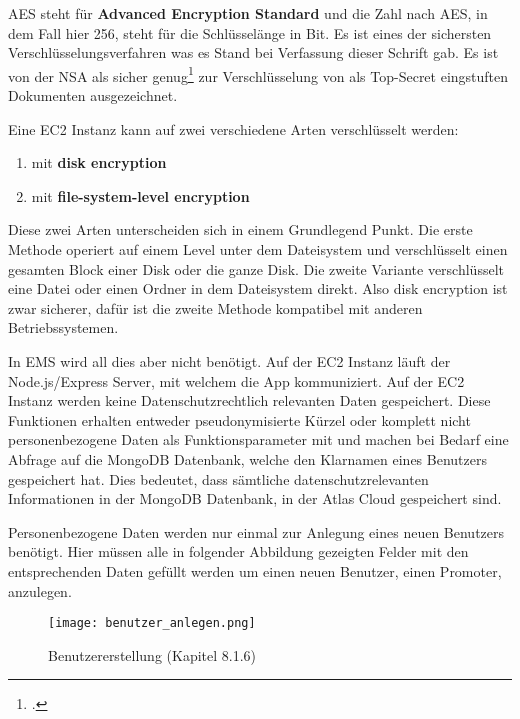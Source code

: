 AES steht für \textbf{Advanced Encryption Standard} und die Zahl nach AES, in dem
Fall hier 256, steht für die Schlüsselänge in Bit. Es ist eines der sichersten Verschlüsselungsverfahren was es Stand bei Verfassung dieser Schrift gab. Es ist von der NSA als sicher genug\footcite{nsa-aws} zur Verschlüsselung von als Top-Secret
eingstuften Dokumenten ausgezeichnet.

Eine EC2 Instanz kann auf zwei verschiedene Arten verschlüsselt werden:
\begin{enumerate}
	\item mit \textbf{disk encryption}
	\item mit \textbf{file-system-level encryption}
\end{enumerate}
Diese zwei Arten unterscheiden sich in einem Grundlegend Punkt. Die erste Methode operiert auf einem Level unter dem Dateisystem und verschlüsselt einen gesamten Block einer Disk oder die ganze Disk. Die zweite Variante
verschlüsselt eine Datei oder einen Ordner in dem Dateisystem direkt. Also disk encryption ist zwar sicherer, dafür ist die zweite Methode kompatibel mit anderen Betriebssystemen.

In EMS wird all dies aber nicht benötigt. Auf der EC2 Instanz läuft der Node.js/Express Server, mit welchem die App kommuniziert. Auf der EC2 Instanz werden keine Datenschutzrechtlich
relevanten Daten gespeichert. Diese Funktionen erhalten entweder pseudonymisierte Kürzel oder komplett nicht personenbezogene Daten als Funktionsparameter mit und machen bei Bedarf eine Abfrage auf die MongoDB Datenbank,
welche den Klarnamen eines Benutzers gespeichert hat. Dies bedeutet, dass sämtliche datenschutzrelevanten Informationen in der MongoDB Datenbank, in der Atlas Cloud gespeichert sind.

Personenbezogene Daten werden nur einmal zur Anlegung eines neuen Benutzers benötigt. Hier müssen alle in folgender Abbildung gezeigten Felder mit den entsprechenden Daten gefüllt werden um einen neuen Benutzer, einen Promoter, anzulegen.
\begin{center}
	\begin{figure}[h]
		\centering
		\texttt{[image: benutzer\_anlegen.png]}
		\caption{Benutzererstellung (Kapitel 8.1.6)}
	\end{figure}
\end{center}

